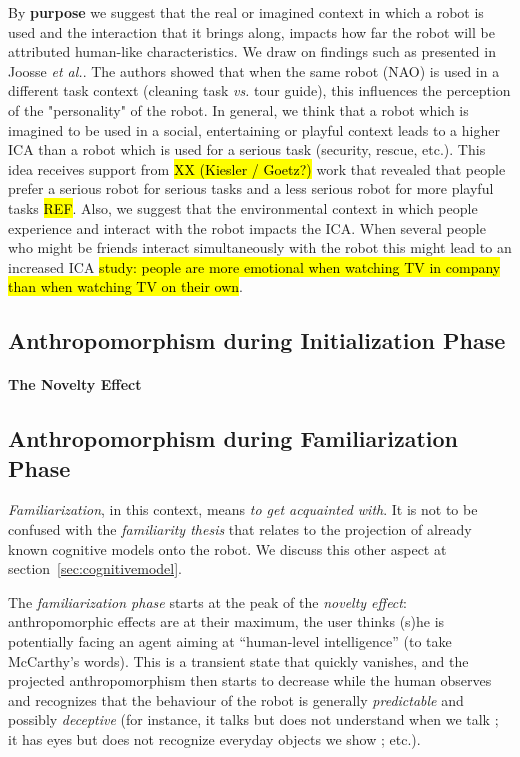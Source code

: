 \documentclass[lettersize, apacite, twoside, HRI]{apa_HRI}
\begin{document}
    By \textbf{purpose} we suggest that the real or imagined context in which a robot is used and the interaction that it brings along, impacts how far the robot will be attributed human-like characteristics. We	draw on findings such as presented in Joosse \textit{et al.}. The authors showed that when the same robot (NAO) is used in a different task context (cleaning task \textit{vs.} tour guide), this influences the perception of the "personality" of the robot. In general, we think that a robot which is imagined to be used in a social, entertaining or playful context leads to a higher ICA than a robot which is used for a serious task (security, rescue, etc.). This idea receives support from \hl{XX (Kiesler / Goetz?)} work that revealed that people prefer a serious robot for serious tasks and a less serious robot for more playful tasks \hl{REF}. Also, we suggest that the environmental context in which people experience and interact with the robot impacts the ICA. When several people who might be friends interact simultaneously with the robot this might lead to an increased ICA \hl{study: people are more emotional when watching TV in company than when watching TV on their own}.

\subsection{Anthropomorphism during Initialization Phase}
\label{sec:initialization}

\paragraph{The Novelty Effect}
\label{sec:noveltyeffect}

\subsection{Anthropomorphism during Familiarization Phase}
\label{sec:familiarization}

\emph{Familiarization}, in this context, means \emph{to get acquainted with}.
It is not to be confused with the \emph{familiarity thesis} that relates to the
projection of already known cognitive models onto the robot. We discuss this other
aspect at section~\ref{sec:cognitivemodel}.

The \emph{familiarization phase} starts at the peak of the \emph{novelty
effect}: anthropomorphic effects are at their maximum, the user thinks (s)he is
potentially facing an agent aiming at ``human-level intelligence'' (to take
McCarthy's words). This is a transient state that quickly vanishes, and the
projected anthropomorphism then starts to decrease while the human observes and
recognizes that the behaviour of the robot is generally \emph{predictable} and
possibly \emph{deceptive} (for instance, it talks but does not understand when
we talk ; it has eyes but does not recognize everyday objects we show ; etc.).
\end{document}
